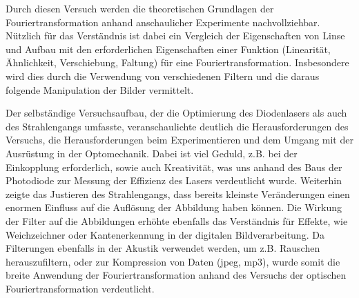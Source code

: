 


Durch diesen Versuch werden die theoretischen Grundlagen der Fouriertransformation anhand anschaulicher Experimente nachvollziehbar. 
Nützlich für das Verständnis ist dabei ein Vergleich der Eigenschaften von Linse
und Aufbau mit den erforderlichen Eigenschaften einer Funktion (Linearität, Ähnlichkeit, Verschiebung, Faltung) für eine Fouriertransformation.
Insbesondere wird dies durch die Verwendung von verschiedenen Filtern und die daraus folgende Manipulation der Bilder vermittelt. 

Der selbständige Versuchsaufbau, der die Optimierung des Diodenlasers als auch des Strahlengangs umfasste, veranschaulichte deutlich die Herausforderungen des Versuchs, die Herausforderungen beim Experimentieren und dem Umgang mit der Ausrüstung in der Optomechanik. Dabei ist viel Geduld, z.B. bei der Einkopplung erforderlich, sowie auch Kreativität, was uns anhand des Baus der Photodiode zur Messung der Effizienz des Lasers verdeutlicht wurde. Weiterhin zeigte das Justieren des Strahlengangs, dass bereits kleinste Veränderungen einen enormen Einfluss auf die Auflösung der Abbildung haben können.
Die Wirkung der Filter auf die Abbildungen erhöhte ebenfalls das Verständnis für Effekte, wie Weichzeichner oder Kantenerkennung in der digitalen Bildverarbeitung. Da Filterungen ebenfalls in der Akustik verwendet werden, um z.B. Rauschen herauszufiltern, oder zur Kompression von Daten (jpeg, mp3), wurde somit die breite Anwendung der Fouriertransformation anhand des Versuchs der optischen Fouriertransformation verdeutlicht.